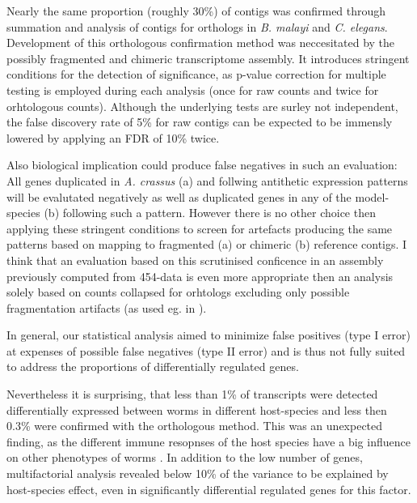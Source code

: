 Nearly the same proportion (roughly 30\%) of contigs was confirmed
through summation and analysis of contigs for orthologs in
\textit{B. malayi} and \textit{C. elegans}. Development of this
orthologous confirmation method was neccesitated by the possibly
fragmented and chimeric transcriptome assembly. It introduces
stringent conditions for the detection of significance, as p-value
correction for multiple testing is employed during each analysis (once
for raw counts and twice for orhtologous counts). Although the
underlying tests are surley not independent, the false discovery rate
of 5\% for raw contigs can be expected to be immensly lowered by
applying an FDR of 10\% twice.

Also biological implication could produce false negatives in such an
evaluation: All genes duplicated in \textit{A. crassus} (a) and
follwing antithetic expression patterns will be evalutated negatively
as well as duplicated genes in any of the model-species (b) following
such a pattern. However there is no other choice then applying these
stringent conditions to screen for artefacts producing the same
patterns based on mapping to fragmented (a) or chimeric (b) reference
contigs. I think that an evaluation based on this scrutinised
conficence in an assembly previously computed from 454-data is even
more appropriate then an analysis solely based on counts collapsed for
orhtologs excluding only possible fragmentation artifacts (as used
eg. in \cite{pmid22084086}).

In general, our statistical analysis aimed to minimize false positives
(type I error) at expenses of possible false negatives (type II error)
and is thus not fully suited to address the proportions of
differentially regulated genes.

Nevertheless it is surprising, that less than 1\% of transcripts were
detected differentially expressed between worms in different
host-species and less then 0.3\% were confirmed with the orthologous
method. This was an unexpected finding, as the different immune
resopnses of the host species have a big influence on other phenotypes
of worms \cite{knopf_swimbladder_2006}. In addition to the low number
of genes, multifactorial analysis revealed below 10\% of the variance
to be explained by host-species effect, even in significantly
differential regulated genes for this factor.

